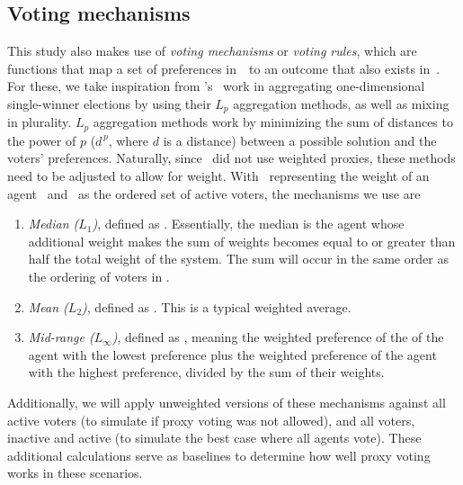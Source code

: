 \subsection{Voting mechanisms}\label{subsec:voting-mechanisms}
This study also makes use of \textit{voting mechanisms} or \textit{voting rules},
which are functions that map a set of preferences in~\systemspace\ to an outcome that
also exists in~\systemspace.
For these, we take inspiration from 's~\cite{Bulteau2021} work in
aggregating one-dimensional single-winner elections by using their $L_p$ aggregation
methods, as well as mixing in plurality.
$L_p$ aggregation methods work by minimizing the sum of distances to the power of $p$
($d^{\,p}$, where $d$ is a distance) between a possible solution and the voters'
preferences.
Naturally, since~\cite{Bulteau2021} did not use weighted proxies, these methods need
to be adjusted to allow for weight.
With \agentweight\ representing the weight of an agent \agent\ and \systemproxies\ as
the ordered set of active voters, the mechanisms we use are
\begin{enumerate}
    \item {
        \textit{Median ($L_1$)}, defined as
        $$.
        Essentially, the median is the agent whose additional weight makes the sum of
        weights becomes equal to or greater than half the total weight of the system.
        The sum will occur in the same order as the ordering of voters in
        \systemproxies.
    }
    \item {
        \textit{Mean ($L_2$)}, defined as
        $$.
        This is a typical weighted average.
    }
    \item {
        \textit{Mid-range ($L_\infty$)}, defined as
        $$, meaning the weighted
        preference of the of the agent with the lowest preference plus the weighted
        preference of the agent with the highest preference, divided by the sum of
        their weights.
    }
\end{enumerate}
Additionally, we will apply unweighted versions of these mechanisms against all active
voters (to simulate if proxy voting was not allowed), and all voters, inactive and
active (to simulate the best case where all agents vote).
These additional calculations serve as baselines to determine how well proxy voting
works in these scenarios.



